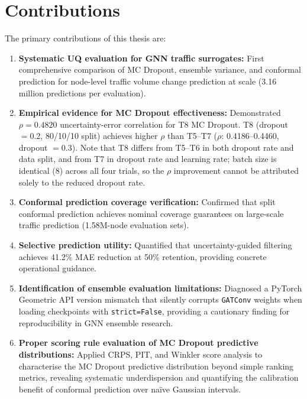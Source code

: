 \section{Contributions}

The primary contributions of this thesis are:

\begin{enumerate}
    \item \textbf{Systematic UQ evaluation for GNN traffic surrogates:} First comprehensive comparison of MC Dropout, ensemble variance, and conformal prediction for node-level traffic volume change prediction at scale (3.16 million predictions per evaluation).

    \item \textbf{Empirical evidence for MC Dropout effectiveness:} Demonstrated $\rho = 0.4820$ uncertainty-error correlation for T8 MC Dropout. T8 (dropout $= 0.2$, 80/10/10 split) achieves higher $\rho$ than T5--T7 ($\rho$: 0.4186--0.4460, dropout $= 0.3$). Note that T8 differs from T5--T6 in both dropout rate and data split, and from T7 in dropout rate and learning rate; batch size is identical (8) across all four trials, so the $\rho$ improvement cannot be attributed solely to the reduced dropout rate.

    \item \textbf{Conformal prediction coverage verification:} Confirmed that split conformal prediction achieves nominal coverage guarantees on large-scale traffic prediction (1.58M-node evaluation sets).

    \item \textbf{Selective prediction utility:} Quantified that uncertainty-guided filtering achieves 41.2\% MAE reduction at 50\% retention, providing concrete operational guidance.

    \item \textbf{Identification of ensemble evaluation limitations:} Diagnosed a PyTorch Geometric API version mismatch that silently corrupts \texttt{GATConv} weights when loading checkpoints with \texttt{strict=False}, providing a cautionary finding for reproducibility in GNN ensemble research.

    \item \textbf{Proper scoring rule evaluation of MC Dropout predictive distributions:} Applied CRPS, PIT, and Winkler score analysis to characterise the MC Dropout predictive distribution beyond simple ranking metrics, revealing systematic underdispersion and quantifying the calibration benefit of conformal prediction over na\"{i}ve Gaussian intervals.
\end{enumerate}

